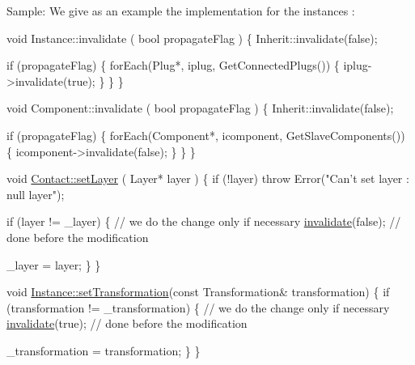 \begin{DoxyParagraph}{Sample\+: We give as an example the implementation for the instances \+:}

\begin{DoxyCode}
\textcolor{keywordtype}{void} Instance::invalidate ( \textcolor{keywordtype}{bool} propagateFlag )
\{
  Inherit::invalidate(\textcolor{keyword}{false});
 
  \textcolor{keywordflow}{if} (propagateFlag) \{
    forEach(Plug*, iplug, GetConnectedPlugs()) \{
      iplug->invalidate(\textcolor{keyword}{true});
    \}
  \}
\}
\end{DoxyCode}
 
\begin{DoxyCode}
\textcolor{keywordtype}{void} Component::invalidate ( \textcolor{keywordtype}{bool} propagateFlag )
\{
  Inherit::invalidate(\textcolor{keyword}{false});
 
  \textcolor{keywordflow}{if} (propagateFlag) \{
    forEach(Component*, icomponent, GetSlaveComponents()) \{
      icomponent->invalidate(\textcolor{keyword}{false});
    \}
  \}
\}
\end{DoxyCode}
 
\begin{DoxyCode}
\textcolor{keywordtype}{void} \mbox{\hyperlink{classHurricane_1_1Contact_aec627634d5b6cfc5079a02b1b518b50e}{Contact::setLayer}} ( Layer* layer )
\{
  \textcolor{keywordflow}{if} (!layer) \textcolor{keywordflow}{throw} Error(\textcolor{stringliteral}{"Can't set layer : null layer"});
 
  \textcolor{keywordflow}{if} (layer != \_layer) \{
    \textcolor{comment}{// we do the change only if necessary}
    \mbox{\hyperlink{classHurricane_1_1Go_a5ee451e118fe8cace16989c0f3a6d855}{invalidate}}(\textcolor{keyword}{false}); \textcolor{comment}{// done before the modification}
 
    \_layer = layer;
  \}
\}
\end{DoxyCode}
 
\begin{DoxyCode}
\textcolor{keywordtype}{void} \mbox{\hyperlink{classHurricane_1_1Instance_a8890d2e1b2ba2542997454297e63512f}{Instance::setTransformation}}(\textcolor{keyword}{const} Transformation& transformation)
\{
  \textcolor{keywordflow}{if} (transformation != \_transformation) \{
    \textcolor{comment}{// we do the change only if necessary}
    \mbox{\hyperlink{classHurricane_1_1Go_a5ee451e118fe8cace16989c0f3a6d855}{invalidate}}(\textcolor{keyword}{true}); \textcolor{comment}{// done before the modification}

    \_transformation = transformation;
  \}
\}
\end{DoxyCode}
 
\end{DoxyParagraph}
\mbox{\label{classHurricane_1_1Go_a54c4351dbbf4045e1aa89f06bb893402}} 
